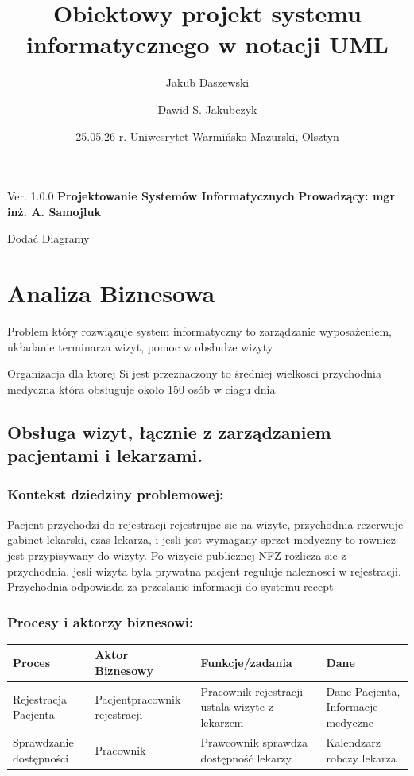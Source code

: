 \documentclass{article}
\author{Jakub Daszewski \and Dawid S. Jakubczyk}
\title{Obiektowy projekt systemu informatycznego w notacji UML}
\date{25.05.26 r. Uniwesrytet Warmińsko-Mazurski, Olsztyn}
\begin{document}
	\begin{titlepage}
	\maketitle
	\center Ver. 1.0.0
	\center \textbf{Projektowanie Systemów Informatycznych}
	\center \textbf{Prowadzący: mgr inż. A. Samojluk} \\
	\begin{LARGE}
	Dodać Diagramy
	\end{LARGE}
	\end{titlepage}
	\tableofcontents
	\newpage
	\section{Analiza Biznesowa}	
	Problem który rozwiązuje system informatyczny to zarządzanie wyposażeniem, układanie terminarza wizyt, pomoc w obsłudze wizyty
	
		
	
	Organizacja dla ktorej Si jest przeznaczony to średniej wielkosci przychodnia medyczna która obsługuje około 150 osób w ciagu dnia
	

\subsection*{Obsługa wizyt, łącznie z zarządzaniem pacjentami i lekarzami.}

\subsubsection*{Kontekst dziedziny problemowej:}
Pacjent przychodzi do rejestracji rejestrujac sie na wizyte, przychodnia rezerwuje gabinet lekarski, czas lekarza, i jesli jest wymagany sprzet medyczny to rowniez jest przypisywany do wizyty. Po wizycie publicznej NFZ rozlicza sie z przychodnia, jesli wizyta byla prywatna pacjent reguluje naleznosci w rejestracji.
Przychodnia odpowiada za przeslanie informacji do systemu recept 
\subsubsection*{Procesy i aktorzy biznesowi:}

\begin{tabular}{|m{6em}|m{10em}|m{18em}|m{7em}|}
\hline
\rowcolor{lightgray} Proces & Aktor Biznesowy & Funkcje/zadania & Dane\\
\hline
Rejestracja Pacjenta	& Pacjent\newline pracownik rejestracji & Pracownik rejestracji ustala wizyte z lekarzem & Dane Pacjenta, Informacje medyczne\\
\hline
Sprawdzanie dostępności & Pracownik & Prawcownik sprawdza dostępność lekarzy & Kalendzarz robczy lekarza\\
\hline
\end{tabular}
\newpage
\end{document}
